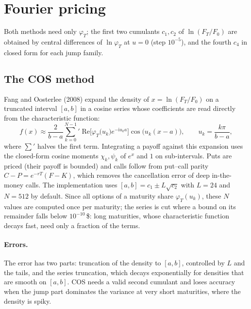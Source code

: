\documentclass[11pt,a4paper]{article}
\theoremstyle{definition}
\theoremstyle{remark}
\newcommand{\ii}{\mathrm{i}}
\begin{document}
\section{Fourier pricing}\label{sec:fourier}
Both methods need only $\varphi_T$; the first two cumulants $c_1,c_2$ of $\ln(F_T/F_0)$ are obtained by central differences of
$\ln\varphi_T$ at $u=0$ (step $10^{-5}$), and the fourth $c_4$ in closed form for each jump family.

\subsection{The COS method}
Fang and Oosterlee (2008) expand the density of $x=\ln(F_T/F_0)$ on a truncated interval $[a,b]$ in a cosine series whose
coefficients are read directly from the characteristic function:
\begin{equation}
  f(x)\approx\frac{2}{b-a}{\sum_{k=0}^{N-1}}{}'\;\mathrm{Re}\Big[\varphi_T\big(u_k\big)e^{-\ii u_ka}\Big]\cos\big(u_k(x-a)\big),\qquad u_k=\frac{k\pi}{b-a},
\end{equation}
where $\sum'$ halves the first term. Integrating a payoff against this expansion uses the closed-form cosine moments
$\chi_k,\psi_k$ of $e^x$ and $1$ on sub-intervals. Puts are priced (their payoff is bounded) and calls follow from put--call
parity $C-P=e^{-rT}(F-K)$, which removes the cancellation error of deep in-the-money calls. The implementation uses
$[a,b]=c_1\pm L\sqrt{c_2}$ with $L=24$ and $N=512$ by default. Since all options of a maturity share $\varphi_T(u_k)$, these
$N$ values are computed once per maturity; the series is cut where a bound on its remainder falls below $10^{-10}$\,\$:
long maturities, whose characteristic function decays fast, need only a fraction of the terms.

\paragraph{Errors.} The error has two parts: truncation of the density to $[a,b]$, controlled by $L$ and the tails, and the
series truncation, which decays exponentially for densities that are smooth on $[a,b]$. COS needs a valid second cumulant and
loses accuracy when the jump part dominates the variance at very short maturities, where the density is spiky.
\end{document}
